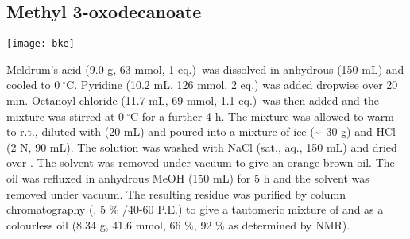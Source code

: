 \newpage

\subsection{Methyl 3-oxodecanoate }

\begin{scheme}[H]
	\begin{center}
		\texttt{[image: bke]}
	\end{center}
\end{scheme}

Meldrum's acid (9.0 g, 63 mmol, 1 eq.)\ was dissolved in anhydrous  (150 mL) and cooled to $0\ ^{\circ}$C. Pyridine (10.2 mL, 126 mmol, 2 eq.) was added dropwise over 20 min. Octanoyl chloride (11.7 mL, 69 mmol, 1.1 eq.)\ was then added and the mixture was stirred at $0\ ^{\circ}$C for a further 4 h. 
The mixture was allowed to warm to r.t., diluted with  (20 mL) and poured into a mixture of ice (\textasciitilde ~30 g) and HCl (2 N, 90 mL). The solution was washed with NaCl (sat., aq., 150 mL) and dried over . The solvent was removed under vacuum to give an orange-brown oil.
The oil was refluxed in anhydrous MeOH (150 mL) for 5 h and the solvent was removed under vacuum. The resulting residue was purified by column chromatography (, 5 \% /40-60 P.E.) to give a tautomeric mixture of  and  as a colourless oil (8.34 g, 41.6 mmol, 66 \%, 92 \% 
 as determined by NMR).
\\[1\baselineskip]

